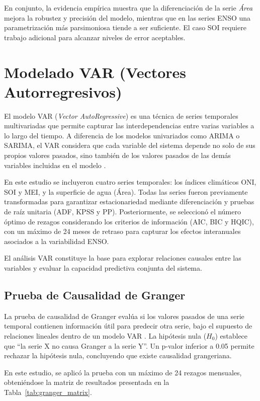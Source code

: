 En conjunto, la evidencia empírica muestra que la diferenciación de la serie \emph{Área}
mejora la robustez y precisión del modelo, mientras que en las series ENSO una
parametrización más parsimoniosa tiende a ser suficiente. El caso SOI requiere trabajo
adicional para alcanzar niveles de error aceptables.

\section{Modelado VAR (Vectores Autorregresivos)}

El modelo VAR (\textit{Vector AutoRegressive}) es una técnica de series temporales multivariadas que permite capturar las interdependencias entre varias variables a lo largo del tiempo. A diferencia de los modelos univariados como ARIMA o SARIMA, el VAR considera que cada variable del sistema depende no solo de sus propios valores pasados, sino también de los valores pasados de las demás variables incluidas en el modelo \parencite{lutkepohl2005new}.

En este estudio se incluyeron cuatro series temporales: los índices climáticos ONI, SOI y MEI, y la superficie de agua (Área). Todas las series fueron previamente transformadas para garantizar estacionariedad mediante diferenciación y pruebas de raíz unitaria (ADF, KPSS y PP). Posteriormente, se seleccionó el número óptimo de rezagos considerando los criterios de información (AIC, BIC y HQIC), con un máximo de 24 meses de retraso para capturar los efectos interanuales asociados a la variabilidad ENSO.

El análisis VAR constituye la base para explorar relaciones causales entre las variables y evaluar la capacidad predictiva conjunta del sistema.

\subsection{Prueba de Causalidad de Granger}

La prueba de causalidad de Granger evalúa si los valores pasados de una serie temporal contienen información útil para predecir otra serie, bajo el supuesto de relaciones lineales dentro de un modelo VAR \parencite{granger1969investigating}.
La hipótesis nula (\(H_0\)) establece que “la serie X no causa Granger a la serie Y”. Un p-valor inferior a 0.05 permite rechazar la hipótesis nula, concluyendo que existe causalidad grangeriana.

En este estudio, se aplicó la prueba con un máximo de 24 rezagos mensuales, obteniéndose la matriz de resultados presentada en la Tabla~\ref{tab:granger_matrix}.


